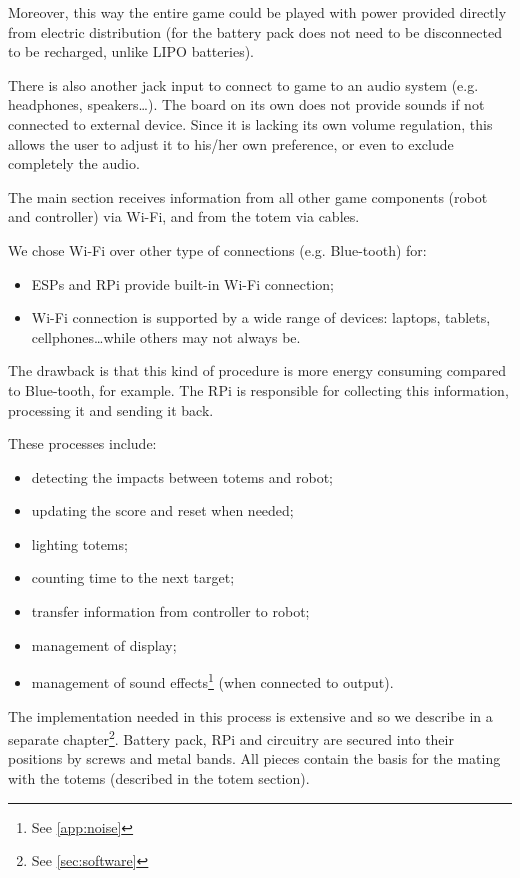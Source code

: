 \documentclass[a4paper,twoside]{book}
\begin{document}
Moreover, this way the entire game could be played with power provided directly from electric distribution (for the battery pack does not need to be disconnected to be recharged, unlike LIPO batteries).

There is also another jack input to connect to game to an audio system (e.g. headphones, speakers\ldots). The board on its own does not provide sounds if not connected to external device. Since it is lacking its own volume regulation, this allows the user to adjust it to his/her own preference, or even to exclude completely the audio.

The main section receives information from all other game components (robot and controller) via Wi-Fi, and from the totem via cables.

\beforelist We chose Wi-Fi over other type of connections (e.g. Blue-tooth) for:
\begin{itemize}
\item ESPs and RPi provide built-in Wi-Fi connection;
\item Wi-Fi connection is supported by a wide range of devices: laptops, tablets, cellphones\ldots while others may not always be. 
\end{itemize}
\afterlist*
The drawback is that this kind of procedure is more energy consuming compared to Blue-tooth, for example.
The RPi is responsible for collecting this information, processing it and sending it back.

\beforelist These processes include:
\begin{itemize}
\item detecting the impacts between totems and robot;
\item updating the score and reset when needed;
\item lighting totems;
\item counting time to the next target;
\item transfer information from controller to robot;
\item management of display;
\item management of sound effects\footnote {See \autoref{app:noise}} (when connected to output).
\end{itemize}
\afterlist*
The implementation needed in this process is extensive and so we describe in a separate chapter\footnote{ See \autoref{sec:software}}.
Battery pack, RPi and circuitry are secured into their positions by screws and metal bands. All pieces contain the basis for the mating with the totems (described in the totem section).
\end{document}
